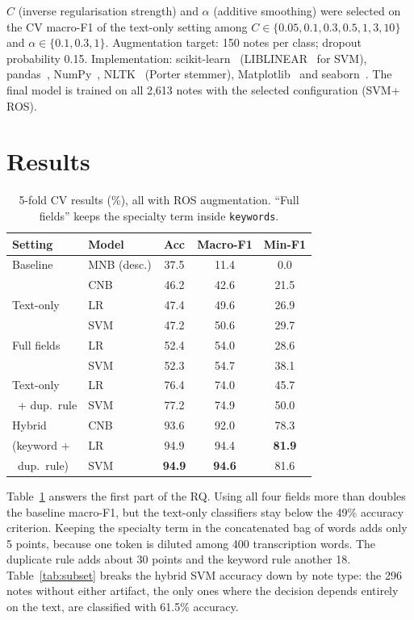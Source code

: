 \documentclass[twocolumn,10pt]{article}
\newcommand{\cv}{CV\xspace}
\newcommand{\svm}{SVM\xspace}
\newcommand{\lr}{LR\xspace}
\newcommand{\cnb}{CNB\xspace}
\newcommand{\ros}{ROS\xspace}
\begin{document}
$C$ (inverse regularisation strength) and $\alpha$ (additive smoothing) were selected on the \cv macro-F1 of the text-only setting among $C\in\{0.05,0.1,0.3,0.5,1,3,10\}$ and $\alpha\in\{0.1,0.3,1\}$. Augmentation target: 150 notes per class; dropout probability 0.15. Implementation: scikit-learn~\cite{sklearn} (LIBLINEAR~\cite{fan2008liblinear} for \svm), pandas~\cite{pandas}, NumPy~\cite{numpy}, NLTK~\cite{nltk} (Porter stemmer), Matplotlib~\cite{matplotlib} and seaborn~\cite{seaborn}. The final model is trained on all 2,613 notes with the selected configuration (\svm + \ros).

\section{Results}

\begin{table}[t]
\centering\small
\setlength{\tabcolsep}{4pt}
\begin{tabular}{llccc}
\toprule
Setting & Model & Acc & Macro-F1 & Min-F1 \\
\midrule
Baseline & MNB (desc.) & 37.5 & 11.4 & 0.0 \\
\midrule
\multirow{3}{*}{Text-only}
 & \cnb & 46.2 & 42.6 & 21.5 \\
 & \lr  & 47.4 & 49.6 & 26.9 \\
 & \svm & 47.2 & 50.6 & 29.7 \\
\midrule
Full fields & \lr & 52.4 & 54.0 & 28.6 \\
            & \svm & 52.3 & 54.7 & 38.1 \\
\midrule
Text-only & \lr  & 76.4 & 74.0 & 45.7 \\
\ + dup.\ rule & \svm & 77.2 & 74.9 & 50.0 \\
\midrule
Hybrid & \cnb & 93.6 & 92.0 & 78.3 \\
(keyword +  & \lr & 94.9 & 94.4 & \textbf{81.9} \\
\ dup.\ rule) & \svm & \textbf{94.9} & \textbf{94.6} & 81.6 \\
\bottomrule
\end{tabular}
\caption{5-fold \cv results (\%), all with \ros augmentation. ``Full fields'' keeps the specialty term inside \texttt{keywords}.}
\label{tab:main}
\end{table}

Table~\ref{tab:main} answers the first part of the RQ. Using all four fields more than doubles the baseline macro-F1, but the text-only classifiers stay below the 49\% accuracy criterion. Keeping the specialty term in the concatenated bag of words adds only 5 points, because one token is diluted among 400 transcription words. The duplicate rule adds about 30 points and the keyword rule another 18. Table~\ref{tab:subset} breaks the hybrid \svm accuracy down by note type: the 296 notes without either artifact, the only ones where the decision depends entirely on the text, are classified with 61.5\% accuracy.
\end{document}
